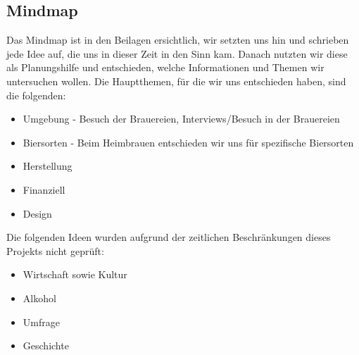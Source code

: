 \subsection{Mindmap}
Das Mindmap ist in den Beilagen ersichtlich, wir setzten uns hin und schrieben jede Idee auf, die uns in dieser Zeit in den Sinn kam. Danach nutzten wir diese als Planungshilfe und entschieden, welche Informationen und Themen wir untersuchen wollen.
Die Hauptthemen, für die wir uns entschieden haben, sind die folgenden:
\begin{itemize}
   \item Umgebung - Besuch der Brauereien, Interviews/Besuch in der Brauereien
   \item Biersorten - Beim Heimbrauen entschieden wir uns für spezifische Biersorten
   \item Herstellung
   \item Finanziell
   \item Design
\end{itemize}
Die folgenden Ideen wurden aufgrund der zeitlichen Beschränkungen dieses Projekts nicht geprüft:
\begin{itemize}
   \item Wirtschaft sowie Kultur
   \item Alkohol
   \item Umfrage
   \item Geschichte
\end{itemize}



